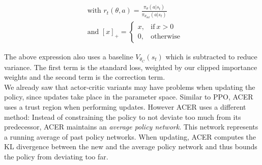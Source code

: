 \begin{align*}
  &\text{with } r_t(\theta, a) = \frac{\pi_\theta(a|s_t)}{\pi_{\theta_{old}}(a|s_t)} \\
  &\text{and } [x]_+ = 
  \begin{cases} 
    x, & \text{if}\ x > 0 \\
    0, & \text{otherwise}
  \end{cases}  
\end{align*}
 

The above expression also uses a baseline $V_{\theta_C}(s_t)$ which is subtracted to reduce variance. The first term is the standard loss, weighted by our clipped importance weights and the second term is the correction term. \\
We already saw that actor-critic variants may have problems when updating the policy, since updates take place in the parameter space. Similar to PPO, ACER uses a trust region when performing updates. However ACER uses a different method: Instead of constraining the policy to not deviate too much from its predecessor, ACER maintains an \textit{average policy network}. This network represents a running average of past policy networks. When updating, ACER computes the KL divergence between the new and the average policy network and thus bounds the policy from deviating too far.

